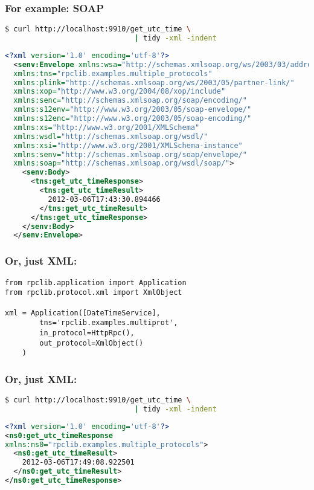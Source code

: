 \documentclass{beamer}
\begin{document}
\begin{frame}[fragile]
  \frametitle{For example: SOAP}

  \begin{lstlisting}[language=sh,frame=topline]
$ curl http://localhost:9910/get_utc_time \
                              | tidy -xml -indent
  \end{lstlisting}
  \tiny
  \begin{lstlisting}[language=xml,frame=bottomline]
  <?xml version='1.0' encoding='utf-8'?>
  <senv:Envelope xmlns:wsa="http://schemas.xmlsoap.org/ws/2003/03/addressing"
  xmlns:tns="rpclib.examples.multiple_protocols"
  xmlns:plink="http://schemas.xmlsoap.org/ws/2003/05/partner-link/"
  xmlns:xop="http://www.w3.org/2004/08/xop/include"
  xmlns:senc="http://schemas.xmlsoap.org/soap/encoding/"
  xmlns:s12env="http://www.w3.org/2003/05/soap-envelope/"
  xmlns:s12enc="http://www.w3.org/2003/05/soap-encoding/"
  xmlns:xs="http://www.w3.org/2001/XMLSchema"
  xmlns:wsdl="http://schemas.xmlsoap.org/wsdl/"
  xmlns:xsi="http://www.w3.org/2001/XMLSchema-instance"
  xmlns:senv="http://schemas.xmlsoap.org/soap/envelope/"
  xmlns:soap="http://schemas.xmlsoap.org/wsdl/soap/">
    <senv:Body>
      <tns:get_utc_timeResponse>
        <tns:get_utc_timeResult>
          2012-03-06T17:43:30.894466
        </tns:get_utc_timeResult>
      </tns:get_utc_timeResponse>
    </senv:Body>
  </senv:Envelope>
  \end{lstlisting}
\end{frame}

\begin{frame}[fragile]
  \frametitle{Or, just XML:}

  \begin{lstlisting}
from rpclib.application import Application
from rpclib.protocol.xml import XmlObject

xml = Application([DateTimeService],
        tns='rpclib.examples.multiprot',
        in_protocol=HttpRpc(),
        out_protocol=XmlObject()
    )
  \end{lstlisting}
\end{frame}


\begin{frame}[fragile]
  \frametitle{Or, just XML:}

  \begin{lstlisting}[language=sh,frame=topline]
$ curl http://localhost:9910/get_utc_time \
                              | tidy -xml -indent
  \end{lstlisting}
  \small
  \begin{lstlisting}[language=xml,frame=bottomline]
<?xml version='1.0' encoding='utf-8'?>
<ns0:get_utc_timeResponse
xmlns:ns0="rpclib.examples.multiple_protocols">
  <ns0:get_utc_timeResult>
    2012-03-06T17:49:08.922501
  </ns0:get_utc_timeResult>
</ns0:get_utc_timeResponse>
  \end{lstlisting}
\end{frame}
\end{document}

